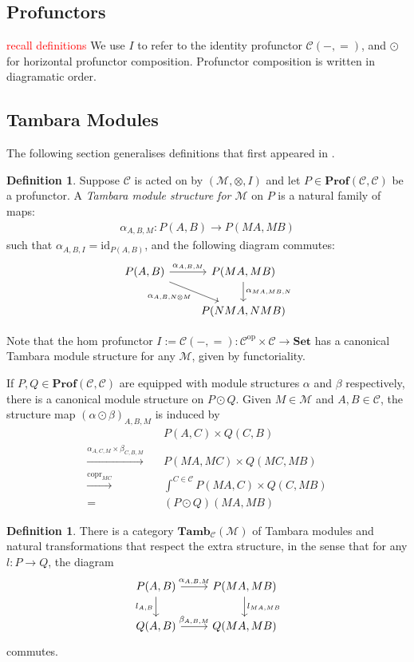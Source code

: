 \documentclass[11pt,a4paper]{article}
\theoremstyle{plain}
\theoremstyle{definition}
\newtheorem{definition}[theorem]{Definition}
\newcommand{\C}{\mathscr{C}}
\newcommand{\M}{\mathscr{M}}
\newcommand{\Set}{\mathbf{Set}}
\newcommand{\Prof}{\mathbf{Prof}}
\newcommand{\Tamb}{\mathbf{Tamb}}
\newcommand{\id}{\mathrm{id}}
\newcommand{\op}{\mathrm{op}}
\DeclareMathOperator{\copr}{copr}
\newcommand{\todo}[1]{\textcolor{red}{\small #1}}
\begin{document}
\subsection{Profunctors}

\todo{recall definitions} We use $I$ to refer to the identity profunctor $\C(-,{=})$, and $\odot$ for horizontal profunctor composition. Profunctor composition is written in diagramatic order.

\subsection{Tambara Modules}
The following section generalises definitions that first appeared in \cite{Doubles}.
\begin{definition}
Suppose $\C$ is acted on by $(\M, \otimes, I)$ and let $P \in \Prof(\C, \C)$ be a profunctor. A \emph{Tambara module structure for $\M$} on $P$ is a natural family of maps:
\begin{align*}
\alpha_{A,B,M} : P(A,B) \to P(MA, MB)
\end{align*}
such that $\alpha_{A,B,I} = \id_{P(A,B)}$, and the following diagram commutes:
\[
\begin{tikzcd}
P(A,B) \ar[r, "\alpha_{A,B,M}"] \ar[dr, "\alpha_{A, B, N \otimes M}" below left] & P(MA, MB) \ar[d, "\alpha_{MA, MB, N}" right] \\
& P(NMA, NMB)
\end{tikzcd}
\]
\end{definition}

Note that the hom profunctor $I := \C(-, =) : \C^\op \times \C \to \Set$ has a canonical Tambara module structure for any $\M$, given by functoriality.

If $P, Q \in \Prof(\C, \C)$ are equipped with module structures $\alpha$ and $\beta$ respectively, there is a canonical module structure on $P \odot Q$. Given $M \in \M$ and $A,B \in \C$, the structure map $(\alpha \odot \beta)_{A,B,M}$ is induced by
\begin{align*}
&P(A,C) \times Q(C,B)  \\
\xrightarrow{\alpha_{A,C,M} \times \beta_{C,B,M}} \quad& P(MA, MC) \times Q(MC, MB) \\
\xrightarrow{\copr_{MC}} \quad&\int^{C \in \C} P(MA, C) \times Q(C, MB) \\
= \quad&(P \odot Q)(MA, MB)
\end{align*}

\begin{definition}
There is a category $\Tamb_\C(\M)$ of Tambara modules and natural transformations that respect the extra structure, in the sense that for any $l : P \to Q$, the diagram
\[
\begin{tikzcd}
P(A,B) \ar[r, "\alpha_{A,B,M}"] \ar[d, "l_{A,B}" left] & P(MA, MB) \ar[d, "l_{MA, MB}" right] \\
Q(A,B) \ar[r, "\beta_{A,B,M}"] & Q(MA, MB)
\end{tikzcd}
\]
commutes.
\end{definition}
\end{document}
